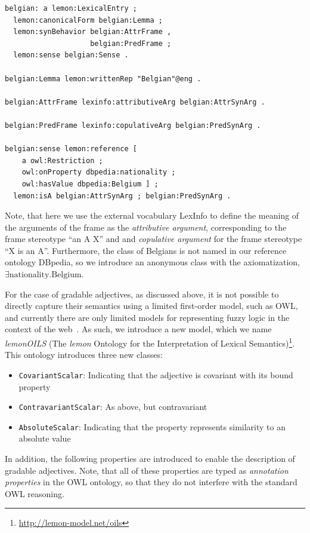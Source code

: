 \documentclass[11pt]{article}
\begin{document}
\begin{verbatim}
belgian: a lemon:LexicalEntry ;
  lemon:canonicalForm belgian:Lemma ;
  lemon:synBehavior belgian:AttrFrame , 
                    belgian:PredFrame ;
  lemon:sense belgian:Sense .

belgian:Lemma lemon:writtenRep "Belgian"@eng .

belgian:AttrFrame lexinfo:attributiveArg belgian:AttrSynArg .

belgian:PredFrame lexinfo:copulativeArg belgian:PredSynArg .

belgian:sense lemon:reference [
    a owl:Restriction ;
    owl:onProperty dbpedia:nationality ;
    owl:hasValue dbpedia:Belgium ] ;
  lemon:isA belgian:AttrSynArg ; belgian:PredSynArg .
\end{verbatim}

Note, that here we use the external vocabulary LexInfo\cite{cimiano2011lexinfo} to define the meaning of the arguments of the frame as the \emph{attributive argument}, corresponding to the frame stereotype ``an A X'' and and \emph{copulative argument} for the frame stereotype ``X is an A''. Furthermore, the class of Belgians is not named in our reference ontology DBpedia, so we introduce an anonymous class with the axiomatization, $\exists \text{nationality}.\text{Belgium}$.

For the case of gradable adjectives, as discussed above, it is not possible to directly capture their semantics using a limited first-order model, such as OWL, and currently there are only limited models for representing fuzzy logic in the context of the web~\cite{zhao2008uncertainty}. As such, we introduce a new model, which we name \emph{lemonOILS} (The \emph{lemon} Ontology for the Interpretation of Lexical Semantics)\footnote{\url{http://lemon-model.net/oils}}. This ontology introduces three new classes:

\begin{itemize}
	\item {\tt CovariantScalar}: Indicating that the adjective is covariant with its bound property
	\item {\tt ContravariantScalar}: As above, but contravariant
	\item {\tt AbsoluteScalar}: Indicating that the property represents similarity to an absolute value
\end{itemize}

In addition, the following properties are introduced to enable the description of gradable adjectives. Note, that all of these properties are typed as \emph{annotation properties} in the OWL ontology, so that they do not interfere with the standard OWL reasoning.
\end{document}
